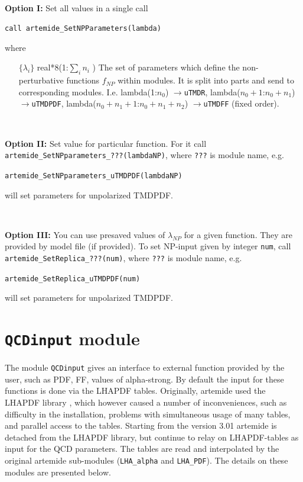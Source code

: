 \documentclass[prd,nofootinbib,eqsecnum,final]{revtex4}
\renewcommand{\(}{\left(}
\renewcommand{\)}{\right)}
\renewcommand{\[}{\left[}
\renewcommand{\]}{\right]}
\begin{document}
~

\textbf{Option I: } Set all values in a single call

\texttt{call artemide{\_}SetNPParameters(lambda)}

where 
\begin{itemize}
\item[$\{\lambda_i\}$] real*8(1:$\sum_i n_i$ ) The set of parameters which define the non-perturbative functions $f_{NP}$ within modules. It is split into parts and send to corresponding modules. I.e. lambda(1:$n_0$) $\to$\texttt{uTMDR}, lambda($n_0+1$:$n_0+n_1$) $\to$\texttt{uTMDPDF},  lambda($n_0+n_1+1$:$n_0+n_1+n_2$) $\to$\texttt{uTMDFF} (fixed order). 
\end{itemize}

~

\textbf{Option II: } Set value for particular function. For it call \texttt{artemide\_SetNPparameters\_???(lambdaNP)}, where \texttt{???} is module name, e.g.

\texttt{\texttt{artemide\_SetNPparameters\_uTMDPDF(lambdaNP)}}

will set parameters for unpolarized TMDPDF.

~

\textbf{Option III: } You can use presaved values of $\lambda_{NP}$ for a given function. They are provided by model file (if provided). To set NP-input given by integer \texttt{num}, call \texttt{artemide\_SetReplica\_???(num)}, where \texttt{???} is module name, e.g.

\texttt{\texttt{artemide\_SetReplica\_uTMDPDF(num)}}

will set parameters for unpolarized TMDPDF.

\newpage

\section{\texttt{QCDinput} module}
\label{QCDinput}

The module \texttt{QCDinput} gives an interface to external function provided by the user, such as PDF, FF, values of alpha-strong. By default the input for these functions is done via the LHAPDF tables. Originally, artemide used the LHAPDF library \cite{Buckley:2014ana}, which however caused a number of inconveniences, such as difficulty in the installation, problems with simultaneous usage of many tables, and parallel access to the tables. Starting from the version 3.01 artemide is detached from the LHAPDF library, but continue to relay on LHAPDF-tables as input for the QCD parameters. The tables are read and interpolated by the original artemide sub-modules (\texttt{LHA\_alpha} and \texttt{LHA\_PDF}). The details on these modules are presented below.
\end{document}
